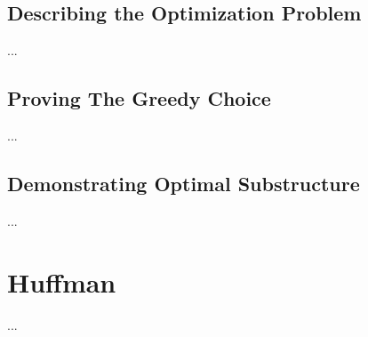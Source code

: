 \subsection{Describing the Optimization Problem}
...

\subsection{Proving The Greedy Choice}
...

\subsection{Demonstrating Optimal Substructure}
...

\section{Huffman}
...


